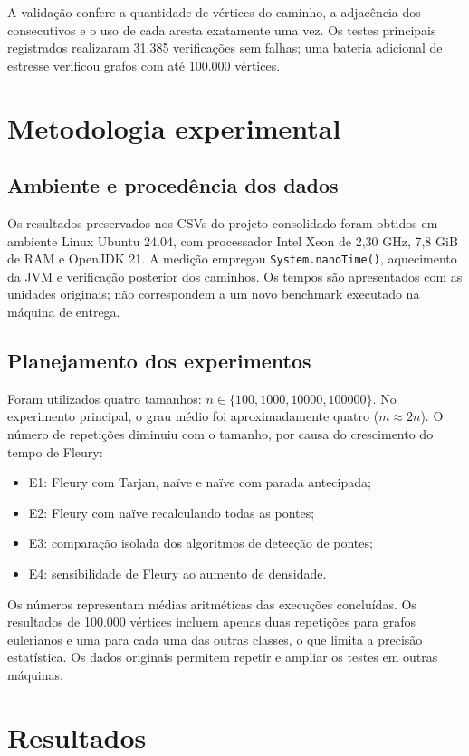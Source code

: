 \documentclass[12pt,a4paper]{article}
\begin{document}
A validação confere a quantidade de vértices do caminho, a adjacência
dos consecutivos e o uso de cada aresta exatamente uma vez. Os testes
principais registrados realizaram 31.385 verificações sem falhas; uma
bateria adicional de estresse verificou grafos com até 100.000 vértices.

\section{Metodologia experimental}
\subsection{Ambiente e procedência dos dados}
Os resultados preservados nos CSVs do projeto consolidado foram obtidos
em ambiente Linux Ubuntu 24.04, com processador Intel Xeon de 2,30 GHz,
7,8 GiB de RAM e OpenJDK 21. A medição empregou
\texttt{System.nanoTime()}, aquecimento da JVM e verificação posterior
dos caminhos. Os tempos são apresentados com as unidades originais;
não correspondem a um novo benchmark executado na máquina de entrega.

\subsection{Planejamento dos experimentos}
Foram utilizados quatro tamanhos: $n\in\{100,1000,10000,100000\}$.
No experimento principal, o grau médio foi aproximadamente quatro
($m\approx2n$). O número de repetições diminuiu com o tamanho,
por causa do crescimento do tempo de Fleury:
\begin{itemize}
\item E1: Fleury com Tarjan, naïve e naïve com parada antecipada;
\item E2: Fleury com naïve recalculando todas as pontes;
\item E3: comparação isolada dos algoritmos de detecção de pontes;
\item E4: sensibilidade de Fleury ao aumento de densidade.
\end{itemize}

Os números representam médias aritméticas das execuções concluídas.
Os resultados de 100.000 vértices incluem apenas duas repetições para
grafos eulerianos e uma para cada uma das outras classes, o que limita
a precisão estatística. Os dados originais permitem repetir e ampliar
os testes em outras máquinas.

\section{Resultados}
\end{document}
